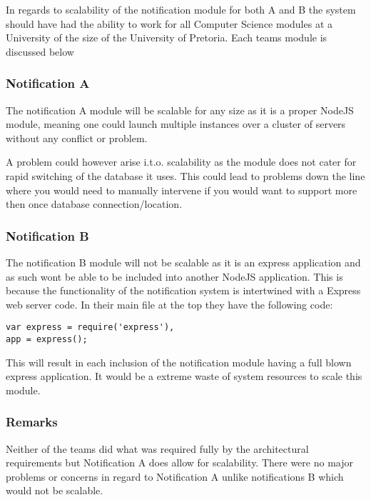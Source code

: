 In regards to scalability of the notification module for both A and B the system should have had the ability to work for all Computer Science
modules at a University of the size of the University of Pretoria. Each teams module is discussed below 
\subsubsection*{Notification A}
The notification A module will be scalable for any size as it is a proper NodeJS module, meaning one could launch multiple instances over a cluster of servers without any conflict or problem.

A problem could however arise i.t.o. scalability as the module does not cater for rapid switching of the database it uses. This could lead to problems down the line where you would need to manually intervene if you would want to support more then once database connection/location.  
\subsubsection*{Notification B}
The notification B module will not be scalable as it is an express application and as such wont be able to be included into another NodeJS application. This is because the functionality of the notification system is intertwined with a Express web server code. In their main file at the top they have the following code: 
\begin{lstlisting}
var express = require('express'),
app = express();
\end{lstlisting}
This will result in each inclusion of the notification module having a full blown express application. It would be a extreme waste of system resources to scale this module. 

\subsubsection*{Remarks}
Neither of the teams did what was required fully by the architectural requirements but Notification A does allow for scalability. There were no major problems or concerns in regard to Notification A unlike notifications B which would not be scalable.